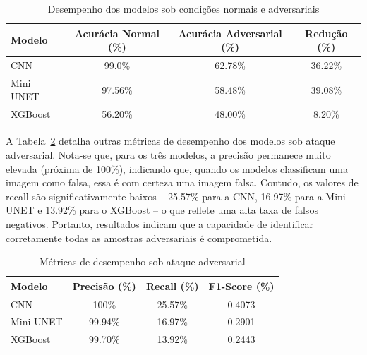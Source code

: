 \documentclass[12pt]{article}
\begin{document}
\begin{table}[htbp]
    \centering
    \caption{Desempenho dos modelos sob condições normais e adversariais}\label{tab:resultados_quantitativos}
    \begin{tabular}{lccc}
        \hline
        \textbf{Modelo} & \textbf{Acurácia Normal (\%)} & \textbf{Acurácia Adversarial (\%)} & \textbf{Redução (\%)} \\
        \hline
        CNN             & 99.0\%                        & 62.78\%                            & 36.22\%               \\
        Mini UNET       & 97.56\%                       & 58.48\%                            & 39.08\%               \\
        XGBoost         & 56.20\%                       & 48.00\%                            & 8.20\%                \\
        \hline
    \end{tabular}
\end{table}

A Tabela~\ref{tab:resultados_metricas} detalha outras métricas de desempenho
dos modelos sob ataque adversarial. Nota-se que, para os três modelos, a
precisão permanece muito elevada (próxima de 100\%), indicando que, quando os
modelos classificam uma imagem como falsa, essa é com certeza uma imagem falsa.
Contudo, os valores de recall são significativamente baixos – 25.57\% para a
CNN, 16.97\% para a Mini UNET e 13.92\% para o XGBoost – o que reflete uma alta
taxa de falsos negativos. Portanto, resultados indicam que a capacidade de
identificar corretamente todas as amostras adversariais é comprometida.

\begin{table}[htbp]
    \centering
    \caption{Métricas de desempenho sob ataque adversarial}\label{tab:resultados_metricas}
    \begin{tabular}{lccc}
        \hline
        \textbf{Modelo} & \textbf{Precisão (\%)} & \textbf{Recall (\%)} & \textbf{F1-Score (\%)} \\
        \hline
        CNN             & 100\%                  & 25.57\%              & 0.4073                 \\
        Mini UNET       & 99.94\%                & 16.97\%              & 0.2901                 \\
        XGBoost         & 99.70\%                & 13.92\%              & 0.2443                 \\
        \hline
    \end{tabular}
\end{table}
\end{document}
